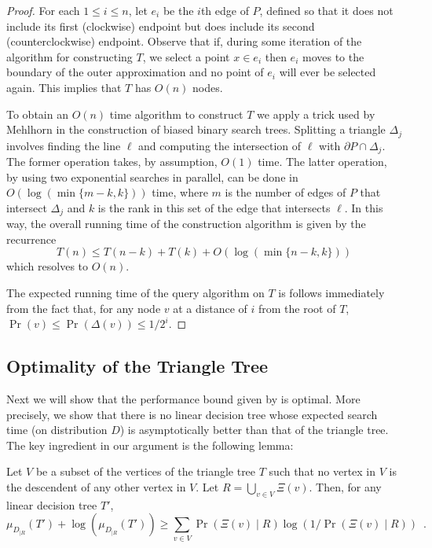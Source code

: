 \documentclass[charterfonts,lotsofwhite]{patmorin}
\newcommand{\boundary}{\partial}
\begin{document}
\begin{proof}
For each $1\le i\le n$, let $e_i$ be the $i$th edge of $P$, defined so
that it does not include its first (clockwise) endpoint but does
include its second (counterclockwise) endpoint.  Observe that if,
during some iteration of the algorithm for constructing $T$, we select
a point $x\in e_i$ then $e_i$ moves to the boundary of the outer
approximation and no point of $e_i$ will ever be selected again.  This
implies that $T$ has $O(n)$ nodes.

To obtain an $O(n)$ time algorithm to construct $T$ we apply a trick
used by Mehlhorn \cite{m75} in the construction of biased binary
search trees.  Splitting a triangle $\Delta_j$ involves finding the
line $\ell$ and computing the intersection of $\ell$ with
$\boundary P\cap \Delta_j$.  The former operation takes, by
assumption, $O(1)$ time.  The latter operation, by using two
exponential searches in parallel, can be done in $O(\log
(\min\{m-k,k\}))$ time, where $m$ is the number of edges of $P$ that
intersect $\Delta_j$ and $k$ is the rank in this set of the edge that
intersects $\ell$.  In this way, the overall running time of the
construction algorithm is given by the recurrence
\[
    T(n) \le T(n-k) + T(k) + O(\log(\min\{n-k,k\}))
\]
which resolves to $O(n)$.

The expected running time of the query algorithm on $T$ is follows
immediately from the fact that, for any node $v$ at a distance of $i$
from the root of $T$, $\Pr(v) \le \Pr(\Delta(v)) \le 1/2^i$.
\end{proof}


\subsection{Optimality of the Triangle Tree}

Next we will show that the performance bound given by
 is optimal.  More precisely, we show that there
is no linear decision tree whose expected search time (on distribution
$D$) is asymptotically better than that of the triangle tree.  The key
ingredient in our argument is the following lemma:

\begin{lem}
Let $V$ be a subset of the vertices of the triangle tree $T$ such that
no vertex in $V$ is the descendent of any other vertex in $V$.  
Let $R=\bigcup_{v\in V} \Xi(v)$. Then, for any linear decision
tree $T'$,
\[
    \mu_{D_{|R}}(T') + \log\left(\mu_{D_{|R}}(T')\right)
	\ge \sum_{v\in V}\Pr(\Xi(v)\mid R)\log(1/\Pr(\Xi(v)\mid R)) \enspace .
\]
\end{lem}
\end{document}

